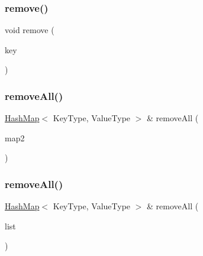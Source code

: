 \subsubsection{\texorpdfstring{remove()}{remove()}}
{\footnotesize\ttfamily void remove (\begin{DoxyParamCaption}\item[{const Key\+Type \&}]{key }\end{DoxyParamCaption})}

\mbox{\label{classHashMap_a55a494654fd27076033553d9c8347ab8}} 
\subsubsection{\texorpdfstring{remove\+All()}{removeAll()}\hspace{0.1cm}{\footnotesize\ttfamily [1/2]}}
{\footnotesize\ttfamily \mbox{\hyperlink{classHashMap}{Hash\+Map}}$<$ Key\+Type, Value\+Type $>$ \& remove\+All (\begin{DoxyParamCaption}\item[{const \mbox{\hyperlink{classHashMap}{Hash\+Map}}$<$ Key\+Type, Value\+Type $>$ \&}]{map2 }\end{DoxyParamCaption})}

\mbox{\label{classHashMap_ade3869d69ed519553a774bc5c91ec021}} 
\subsubsection{\texorpdfstring{remove\+All()}{removeAll()}\hspace{0.1cm}{\footnotesize\ttfamily [2/2]}}
{\footnotesize\ttfamily \mbox{\hyperlink{classHashMap}{Hash\+Map}}$<$ Key\+Type, Value\+Type $>$ \& remove\+All (\begin{DoxyParamCaption}\item[{std\+::initializer\+\_\+list$<$ std\+::pair$<$ Key\+Type, Value\+Type $>$ $>$}]{list }\end{DoxyParamCaption})}

\mbox{\label{classHashMap_a1950d5bcede3332689f1080441cc065e}} 
